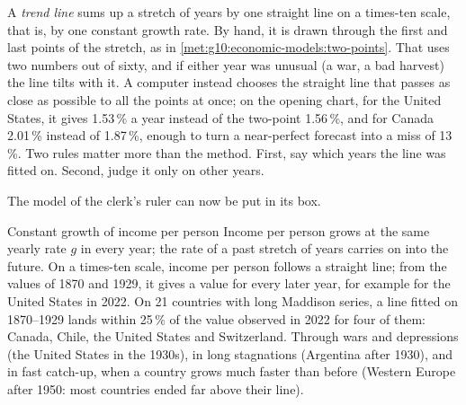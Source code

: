 \begin{measure}
A \emph{trend line} sums up a stretch of years by one straight line on a times-ten scale, that is,
by one constant growth rate. By hand, it is drawn through the first and last points of the
stretch, as in \cref{met:g10:economic-models:two-points}. That uses two numbers out of sixty, and
if either year was unusual (a war, a bad harvest) the line tilts with it. A computer instead
chooses the straight line that passes as close as possible to all the points at once; on the
opening chart, for the United States, it gives 1.53\,\% a year instead of the two-point 1.56\,\%, and for Canada 2.01\,\% instead of 1.87\,\%, enough to turn a near-perfect forecast into a miss of 13\,\%.
Two rules matter more than the method. First, say which years the line was fitted on. Second, judge
it only on other years.
\end{measure}

The model of the clerk's ruler can now be put in its box.

\begin{model}{Constant growth of income per person}
\assumes Income per person grows at the same yearly rate $g$ in every year; the rate of a past
  stretch of years carries on into the future.
\predicts On a times-ten scale, income per person follows a straight line; from the values of
  1870 and 1929, it gives a value for every later year, for example  for the United
  States in 2022.
\tested On 21 countries with long Maddison series, a line fitted on 1870--1929 lands within 25\,\%
  of the value observed in 2022 for four of them: Canada, Chile, the United States and
  Switzerland.
\breaks Through wars and depressions (the United States in the 1930s), in long stagnations
  (Argentina after 1930), and in fast catch-up, when a country grows much faster than before
  (Western Europe after 1950: most countries ended far above their line).
\end{model}


